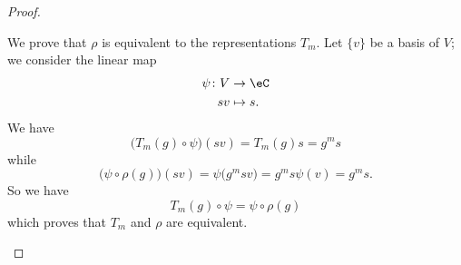 \begin{proof}
\begin{subproof}
		We prove that \( \rho\) is equivalent to the representations \( T_m\). Let \( \{ v \}\) be a basis of \( V\); we consider the linear map
		\begin{equation}
			\begin{aligned}
				\psi\colon V & \to \eC    \\
				sv           & \mapsto s.
			\end{aligned}
		\end{equation}
		We have
		\begin{equation}
			\big( T_m(g)\circ \psi \big)(sv)=T_m(g)s=g^ms
		\end{equation}
		while
		\begin{equation}
			\big( \psi\circ\rho(g) \big)(sv)=\psi\big( g^msv \big)=g^ms\psi(v)=g^ms.
		\end{equation}
		So we have
		\begin{equation}
			T_m(g)\circ \psi=\psi\circ\rho(g)
		\end{equation}
		which proves that \( T_m\) and \( \rho\) are equivalent.
	\end{subproof}
\end{proof}
